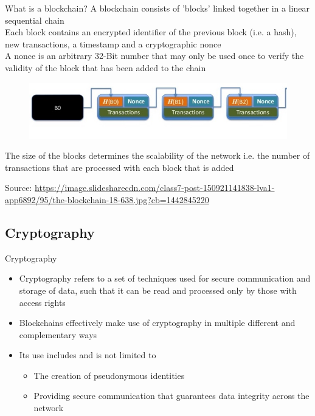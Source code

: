 \documentclass[11pt]{beamer}
\begin{document}
\begin{frame}{What is a blockchain?}
	A blockchain consists of 'blocks' linked together in a linear sequential chain\\ \vspace{3mm}
	Each block contains an encrypted identifier of the previous block (i.e. a hash), new transactions, a timestamp and a cryptographic nonce\\ \vspace{3mm}
	A nonce is an arbitrary 32-Bit number that may only be used once to verify the validity of the block that has been added to the chain
	\begin{figure}[]
		\centering
		\includegraphics  [width=3.in]{Images/blockchain1}
	\end{figure}
	The size of the blocks determines the scalability of the network i.e. the number of transactions that are processed with each block that is added\\ \vspace{3mm}
	\begin{tiny}
		Source: \href{https://www.slideshare.net/DavidEvansUVa/the-blockchain}{https://image.slidesharecdn.com/class7-post-150921141838-lva1-app6892/95/the-blockchain-18-638.jpg?cb=1442845220}
	\end{tiny}
\end{frame}

\subsection{Cryptography}

\begin{frame}{Cryptography}
	\begin{itemize}
		\item Cryptography refers to a set of techniques used for secure communication and storage of data, such that it can be read and processed only by those with access rights
		\item Blockchains effectively make use of cryptography in multiple different and complementary ways
		\item Its use includes and is not limited to
		\begin{itemize}
			\item The creation of pseudonymous identities
			\item Providing secure communication that guarantees data integrity across the network
		\end{itemize}
	\end{itemize}
\end{frame}
\end{document}
